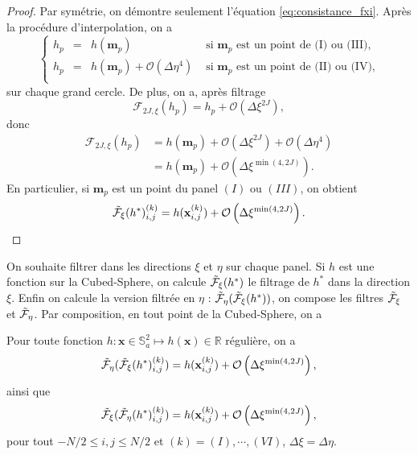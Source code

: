 \begin{proof}
Par symétrie, on démontre seulement l'équation \eqref{eq:consistance_fxi}.
Après la procédure d'interpolation, on a 
\begin{equation}
\left\lbrace
\begin{array}{rccl}
h_p & = & h(\mathbf{m}_p) & \text{ si } \mathbf{m}_p \text{ est un point de (I) ou (III),} \\ 
h_p & = & h(\mathbf{m}_p) + \mathcal{O}(\Delta \eta^4) & \text{ si } \mathbf{m}_p \text{ est un point de (II) ou (IV),} \\ 
\end{array}
\right.
\end{equation} 
sur chaque grand cercle. De plus, on a, après filtrage
\begin{equation}
\mathcal{F}_{2J,\xi}(h_p) = h_p + \mathcal{O}(\Delta \xi^{2J}),
\end{equation}
donc
\begin{align*}
\mathcal{F}_{2J,\xi}(h_p) & = h(\mathbf{m}_p) + \mathcal{O}(\Delta \xi^{2J}) + \mathcal{O}(\Delta \eta^4) \\
	& = h(\mathbf{m}_p) + \mathcal{O}\left( \Delta \xi^{\min(4,2J)} \right).
\end{align*}
En particulier, si $\mathbf{m}_p$ est un point du panel $(I)$ ou $(III)$, on obtient
\begin{equation}
\tilde{\mathcal{F}}_{\xi}(h^*)_{i,j}^{(k)} = h(\mathbf{x}_{i,j}^{(k)}) + \mathcal{O}\left( \Delta \xi^{\min(4,2J)} \right).
\end{equation}
\end{proof}

On souhaite filtrer dans les directions $\xi$ et $\eta$ sur chaque panel. Si $h$ est une fonction sur la Cubed-Sphere, on calcule $\tilde{\mathcal{F}}_{\xi}(h^*)$ le filtrage de $h^*$ dans la direction $\xi$. Enfin on calcule la version filtrée en $\eta$ : $\tilde{\mathcal{F}}_{\eta}( \tilde{\mathcal{F}}_{\xi}(h^*))$, on compose les filtres $\tilde{\mathcal{F}}_{\xi}$ et $\tilde{\mathcal{F}}_{\eta}$. Par composition, en tout point de la Cubed-Sphere, on a 

\begin{proposition}
Pour toute fonction $h : \mathbf{x} \in \mathbb{S}_a^2 \mapsto h(\mathbf{x}) \in \mathbb{R}$ régulière, on a 
\begin{equation}
\tilde{\mathcal{F}}_{\eta}(\tilde{\mathcal{F}}_{\xi}(h^*)_{i,j}^{(k)}) = h(\mathbf{x}_{i,j}^{(k)}) + \mathcal{O}\left( \Delta \xi^{\min(4,2J)} \right),
\label{eq:consistance_ftretaxi_comp}
\end{equation}
ainsi que
\begin{equation}
\tilde{\mathcal{F}}_{\xi}(\tilde{\mathcal{F}}_{\eta}(h^*)_{i,j}^{(k)}) = h(\mathbf{x}_{i,j}^{(k)}) + \mathcal{O}\left( \Delta \xi^{\min(4,2J)} \right),
\label{eq:consistance_ftrxieta_comp}
\end{equation}
pour tout $-N/2 \leq i,j \leq N/2$ et $(k) = (I), \cdots , (VI)$, $\Delta \xi = \Delta \eta$.
\label{prop:consistance_ftrxieta_comp}
\end{proposition}

